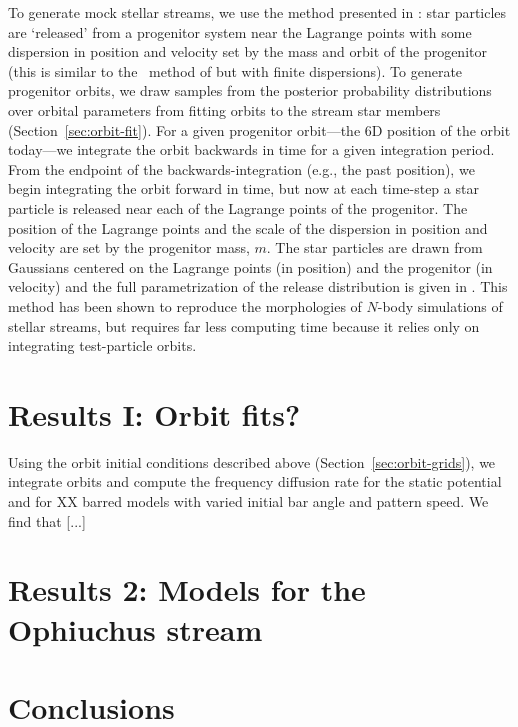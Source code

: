 \documentclass[letterpaper,12pt,preprint]{aastex}
\begin{document}
To generate mock stellar streams, we use the method presented in \citep{fardal14}: star particles are `released' from a progenitor system near the Lagrange points with some dispersion in position and velocity set by the mass and orbit of the progenitor (this is similar to the \streakline\ method of \citet{kuepper12} but with finite dispersions). To generate progenitor orbits, we draw samples from the posterior probability distributions over orbital parameters from fitting orbits to the stream star members (Section~\ref{sec:orbit-fit}). For a given progenitor orbit---the 6D position of the orbit today---we integrate the orbit backwards in time for a given integration period. From the endpoint of the backwards-integration (e.g., the past position), we begin integrating the orbit forward in time, but now at each time-step a star particle is released near each of the Lagrange points of the progenitor. The position of the Lagrange points and the scale of the dispersion in position and velocity are set by the progenitor mass, $m$. The star particles are drawn from Gaussians centered on the Lagrange points (in position) and the progenitor (in velocity) and the full parametrization of the release distribution is given in \cite{fardal14}. This method has been shown to reproduce the morphologies of $N$-body simulations of stellar streams, but requires far less computing time because it relies only on integrating test-particle orbits.

\section{Results I: Orbit fits?}

Using the orbit initial conditions described above (Section~\ref{sec:orbit-grids}), we integrate orbits and compute the frequency diffusion rate for the static potential and for XX barred models with varied initial bar angle and pattern speed. We find that [...] 

\section{Results 2: Models for the Ophiuchus stream}

\section{Conclusions}\label{sec:conclusions}
\end{document}
